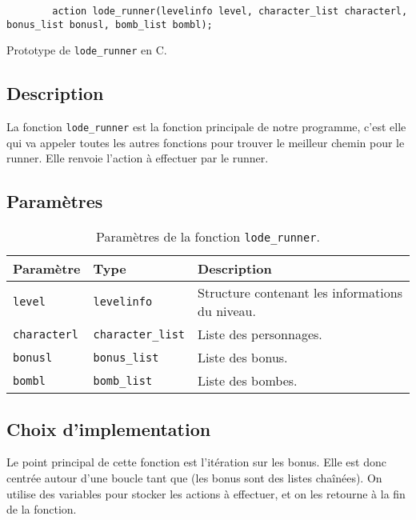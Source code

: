 \begin{listing}[!htpb]
    \begin{verbatim}
        action lode_runner(levelinfo level, character_list characterl, bonus_list bonusl, bomb_list bombl);
    \end{verbatim}
    \caption{Prototype de \texttt{lode\_runner} en C.}
    \label{listing:c-lode_runner-prototype}
\end{listing}

\subsection{Description}

La fonction \texttt{lode\_runner} est la fonction principale de notre programme, c'est elle qui va appeler toutes les autres fonctions pour trouver le meilleur chemin pour le runner.
Elle renvoie l'action à effectuer par le runner.

\subsection{Paramètres}

\begin{table}[!htpb]
    \begin{tabularx}{\textwidth}{lXX}
        \toprule
        \textbf{Paramètre} & \textbf{Type} & \textbf{Description} \\
        \midrule
        \texttt{level} & \texttt{levelinfo} & Structure contenant les informations du niveau. \\
        \texttt{characterl} & \texttt{character\_list} & Liste des personnages. \\
        \texttt{bonusl} & \texttt{bonus\_list} & Liste des bonus. \\
        \texttt{bombl} & \texttt{bomb\_list} & Liste des bombes. \\
        \bottomrule
    \end{tabularx}
    \caption{Paramètres de la fonction \texttt{lode\_runner}.}
    \label{tab:parameters-lode_runner}
\end{table}

\subsection{Choix d'implementation}

Le point principal de cette fonction est l'itération sur les bonus.
Elle est donc centrée autour d'une boucle tant que (les bonus sont des listes chaînées).
On utilise des variables pour stocker les actions à effectuer, et on les retourne à la fin de la fonction.

